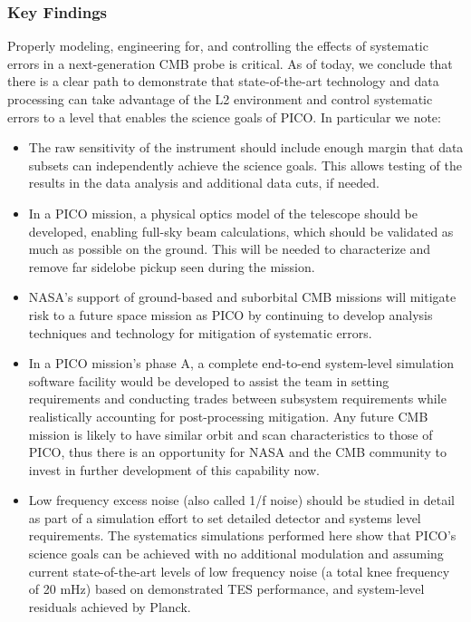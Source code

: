 \documentclass[PICOReport.tex]{subfiles}
\begin{document}
\subsubsection{Key Findings}
Properly modeling, engineering for, and controlling the effects of systematic errors in a
next-generation CMB probe is critical.  As of today, we conclude that there is a clear path to demonstrate that state-of-the-art technology and data processing can take advantage of the L2 environment and control systematic errors to a level that enables the science goals of PICO. In particular we note:
\begin{itemize}
\item The raw sensitivity of the instrument should include enough margin
that data subsets can independently achieve the science goals.
This allows testing of the results in the data analysis and additional
data cuts, if needed.
\item In a PICO mission, a physical optics model of the telescope should be developed, enabling full-sky beam calculations, which should be validated as much as possible on the ground.  This will be needed to characterize and remove far sidelobe pickup seen during the mission. 
\item NASA's support of ground-based and suborbital CMB missions will mitigate risk to a future space mission as PICO by continuing to develop analysis techniques and technology for mitigation of systematic errors.

\item In a PICO mission's phase A, a complete end-to-end system-level
simulation software facility would be developed to assist the team in setting 
requirements and conducting trades between subsystem requirements while
realistically accounting for post-processing mitigation.  Any future
CMB mission is likely to have similar orbit  
and scan characteristics to those of PICO, thus there is an opportunity for NASA and
the CMB community to invest in further development of this capability now.
\item Low frequency excess noise (also called 1/f noise) should be studied in detail as part of a simulation effort to set detailed detector and systems level requirements.  The systematics simulations performed here show that PICO's science goals can be achieved with no additional modulation and assuming current state-of-the-art levels of low frequency noise (a total knee frequency of 20 mHz) based on demonstrated TES performance, and system-level residuals achieved by Planck.
\end{itemize}
\end{document}
